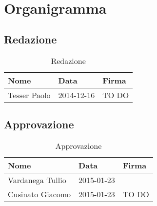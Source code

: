 %

\appendix

\section{Organigramma} %
\label{sec:organigramma}
	\subsection{Redazione} %
	\label{sub:redazione}
		\begin{table}[!h]
			\begin{center}
				\begin{tabularx}{0.8\textwidth}{|X|X|X|}
					\hline
					\textbf{Nome} & \textbf{Data} & \textbf{Firma} \\
					\hline
					\rule[-4mm]{0mm}{1cm}
					Tesser Paolo &
					2014-12-16 &
					TO DO \\
					\hline
				\end{tabularx}
			\end{center}
		\caption{Redazione}
		\end{table}
	
	\subsection{Approvazione} %
	\label{sub:approvazione}
		\begin{table}[!h]
			\begin{center}
				\begin{tabularx}{0.8\textwidth}{|X|X|X|}
					\hline
					\textbf{Nome} & \textbf{Data} & \textbf{Firma} \\
					\hline
					\rule[-4mm]{0mm}{1cm}
					Vardanega Tullio &
					2015-01-23 &
					\\
					\hline
					\rule[-4mm]{0mm}{1cm}
					Cusinato Giacomo &
					2015-01-23 &
					TO DO \\
					\hline
				\end{tabularx}
			\end{center}
		\caption{Approvazione}
		\end{table}
	
